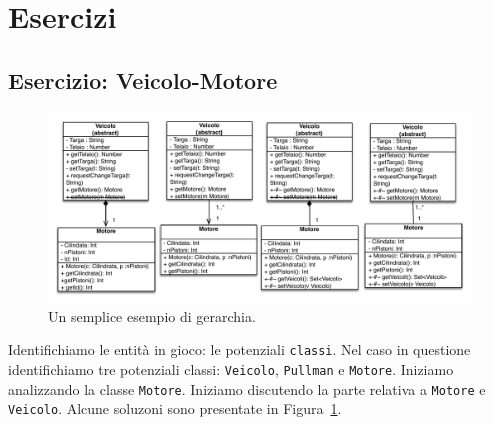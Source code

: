 \documentclass{article}
\begin{document}
\section{Esercizi}

\subsection{Esercizio: Veicolo-Motore}



\begin{figure}[h!]
  \centering
    \includegraphics[width=1\textwidth]{Img/motoreveicolo.pdf}
      \caption{Un semplice esempio di gerarchia.}
      \label{Fig:motoreveicolo}
\end{figure}
Identifichiamo le entit\`a in gioco: le potenziali \texttt{classi}. Nel caso in questione identifichiamo tre potenziali classi: \texttt{Veicolo}, \texttt{Pullman} e \texttt{Motore}. Iniziamo analizzando la classe \texttt{Motore}.
Iniziamo discutendo la parte relativa a \texttt{Motore} e  \texttt{Veicolo}. Alcune soluzoni sono presentate in Figura~\ref{Fig:motoreveicolo}.
\end{document}
